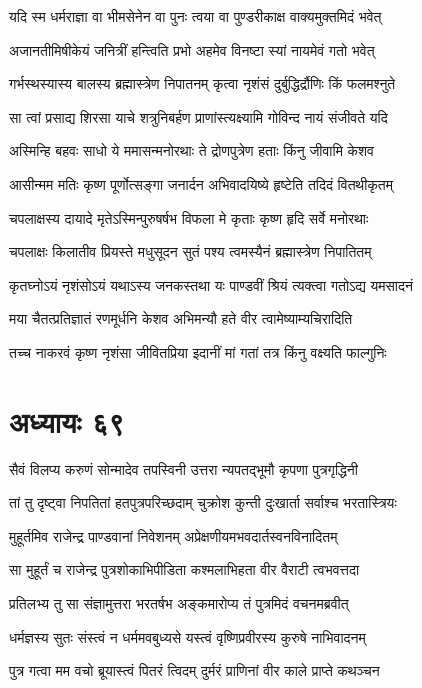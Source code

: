 \twolineshloka
{यदि स्म धर्मराज्ञा वा भीमसेनेन वा पुनः}
{त्वया वा पुण्डरीकाक्ष वाक्यमुक्तमिदं भवेत्}


\twolineshloka
{अजानतीमिषीकेयं जनित्रीं हन्त्विति प्रभो}
{अहमेव विनष्टा स्यां नायमेवं गतो भवेत्}


\twolineshloka
{गर्भस्थस्यास्य बालस्य ब्रह्मास्त्रेण निपातनम्}
{कृत्वा नृशंसं दुर्बुद्धिर्द्रौणिः किं फलमश्नुते}


\twolineshloka
{सा त्वां प्रसाद्य शिरसा याचे शत्रुनिबर्हण}
{प्राणांस्त्यक्ष्यामि गोविन्द नायं संजीवते यदि}


\twolineshloka
{अस्मिन्हि बहवः साधो ये ममासन्मनोरथाः}
{ते द्रोणपुत्रेण हताः किंनु जीवामि केशव}


\twolineshloka
{आसीन्मम मतिः कृष्ण पूर्णोत्सङ्गा जनार्दन}
{अभिवादयिष्ये हृष्टेति तदिदं वितथीकृतम्}


\twolineshloka
{चपलाक्षस्य दायादे मृतेऽस्मिन्पुरुषर्षभ}
{विफला मे कृताः कृष्ण हृदि सर्वे मनोरथाः}


\twolineshloka
{चपलाक्षः किलातीव प्रियस्ते मधुसूदन}
{सुतं पश्य त्वमस्यैनं ब्रह्मास्त्रेण निपातितम्}


\twolineshloka
{कृतघ्नोऽयं नृशंसोऽयं यथाऽस्य जनकस्तथा}
{यः पाण्डवीं श्रियं त्यक्त्वा गतोऽद्य यमसादनं}


\twolineshloka
{मया चैतत्प्रतिज्ञातं रणमूर्धनि केशव}
{अभिमन्यौ हते वीर त्वामेष्याम्यचिरादिति}


\twolineshloka
{तच्च नाकरवं कृष्ण नृशंसा जीवितप्रिया}
{इदानीं मां गतां तत्र किंनु वक्ष्यति फाल्गुनिः}


\chapter{अध्यायः ६९}
\twolineshloka
{सैवं विलप्य करुणं सोन्मादेव तपस्विनी}
{उत्तरा न्यपतद्भूमौ कृपणा पुत्रगृद्धिनी}


\twolineshloka
{तां तु दृष्ट्वा निपतितां हतपुत्रपरिच्छदाम्}
{चुक्रोश कुन्ती दुःखार्ता सर्वाश्च भरतास्त्रियः}


\twolineshloka
{मुहूर्तमिव राजेन्द्र पाण्डवानां निवेशनम्}
{अप्रेक्षणीयमभवदार्तस्वनविनादितम्}


\twolineshloka
{सा मुहूर्तं च राजेन्द्र पुत्रशोकाभिपीडिता}
{कश्मलाभिहता वीर वैराटी त्वभवत्तदा}


\twolineshloka
{प्रतिलभ्य तु सा संज्ञामुत्तरा भरतर्षभ}
{अङ्कमारोप्य तं पुत्रमिदं वचनमब्रवीत्}


\twolineshloka
{धर्मज्ञस्य सुतः संस्त्वं न धर्ममवबुध्यसे}
{यस्त्वं वृष्णिप्रवीरस्य कुरुषे नाभिवादनम्}


\twolineshloka
{पुत्र गत्वा मम वचो ब्रूयास्त्वं पितरं त्विदम्}
{दुर्मरं प्राणिनां वीर काले प्राप्ते कथञ्चन}


